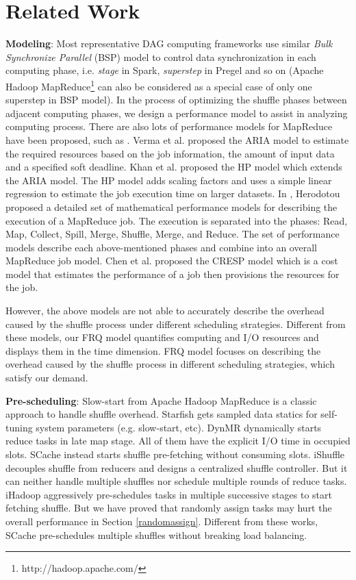 \section{Related Work}

{\color{blue}
\textbf{Modeling}: Most representative DAG computing frameworks use similar \textit{Bulk Synchronize Parallel} (BSP)\cite{valiant1990bridging} model to control data synchronization in each computing phase, i.e. \textit{stage} in Spark, \textit{superstep} in Pregel\cite{malewicz2010pregel} and so on (Apache Hadoop MapReduce\footnote{http://hadoop.apache.com/} can also be considered as a special case of only one superstep in BSP model). 
In the process of optimizing the shuffle phases between adjacent computing phases, we design a performance model to assist in analyzing computing process.
There are also lots of performance models for MapReduce have been proposed, such as \cite{verma2011aria, khan2016hadoop, herodotou2011hadoop, chen2014cresp}.
Verma et al. \cite{verma2011aria} proposed the ARIA model to estimate the required resources based on the job information, the amount of input data and a specified soft deadline.
Khan et al. \cite{khan2016hadoop} proposed the HP model which extends the ARIA model. The HP model adds scaling factors and uses a simple linear regression to estimate the job execution time on larger datasets.
In \cite{herodotou2011hadoop}, Herodotou proposed a detailed set of mathematical performance models for describing the execution of a MapReduce job. The execution is separated into the phases: Read, Map, Collect, Spill, Merge, Shuffle, Merge, and Reduce. The set of performance models describe each above-mentioned phases and combine into an overall MapReduce job model. 
Chen et al. \cite{chen2014cresp} proposed the CRESP model which is a cost model that estimates the performance of a job then 
provisions the resources for the job.

However, the above models are not able to accurately describe the overhead caused by the shuffle process under different scheduling strategies. 
Different from these models, our FRQ model quantifies computing and I/O resources and displays them in the time dimension. FRQ model focuses on describing the overhead caused by the shuffle process in different scheduling strategies, which satisfy our demand.
}

\textbf{Pre-scheduling}: Slow-start from Apache Hadoop MapReduce is a classic approach to handle shuffle overhead. 
Starfish \cite{starfish} gets sampled data statics for self-tuning system parameters (e.g. slow-start, etc). 
DynMR \cite{dynmr} dynamically starts reduce tasks in late map stage. 
All of them have the explicit I/O time in occupied slots. 
SCache instead starts shuffle pre-fetching without consuming slots. 
iShuffle \cite{guo2017ishuffle} decouples shuffle from reducers and designs a centralized shuffle controller. 
But it can neither handle multiple shuffles nor schedule multiple rounds of reduce tasks. 
iHadoop \cite{ihadoop} aggressively pre-schedules tasks in multiple successive stages to start fetching shuffle. 
But we have proved that randomly assign tasks may hurt the overall performance in Section \ref{randomassign}. 
Different from these works, SCache pre-schedules multiple shuffles without breaking load balancing. 

